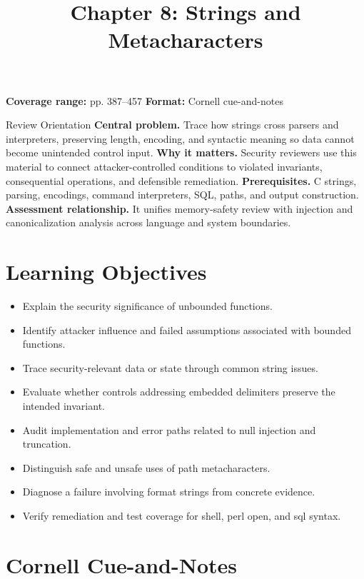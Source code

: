\documentclass[11pt,letterpaper]{article}
\title{Chapter 8: Strings and Metacharacters}
\author{}
\date{}
\begin{document}
\maketitle

\begin{center}
\small\color{Meta}\textbf{Coverage range:} pp. 387--457 \quad\textbullet\quad \textbf{Format:} Cornell cue-and-notes
\end{center}
\vspace{0.25em}
\begin{CornellOverviewBox}{Review Orientation}
\textbf{Central problem.} Trace how strings cross parsers and interpreters, preserving length, encoding, and syntactic meaning so data cannot become unintended control input.
\textbf{Why it matters.} Security reviewers use this material to connect attacker-controlled conditions to violated invariants, consequential operations, and defensible remediation.
\textbf{Prerequisites.} C strings, parsing, encodings, command interpreters, SQL, paths, and output construction.
\textbf{Assessment relationship.} It unifies memory-safety review with injection and canonicalization analysis across language and system boundaries.
\end{CornellOverviewBox}
\section{Learning Objectives}
\begin{itemize}
\item Explain the security significance of unbounded functions.
\item Identify attacker influence and failed assumptions associated with bounded functions.
\item Trace security-relevant data or state through common string issues.
\item Evaluate whether controls addressing embedded delimiters preserve the intended invariant.
\item Audit implementation and error paths related to null injection and truncation.
\item Distinguish safe and unsafe uses of path metacharacters.
\item Diagnose a failure involving format strings from concrete evidence.
\item Verify remediation and test coverage for shell, perl open, and sql syntax.
\end{itemize}
\section{Cornell Cue-and-Notes}
\end{document}
